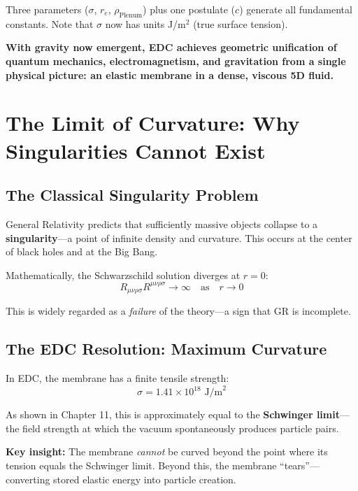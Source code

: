 Three parameters ($\sigma$, $r_e$, $\rho_{\text{Plenum}}$) plus one postulate ($c$) generate all fundamental constants. Note that $\sigma$ now has units J/m$^2$ (true surface tension).

\textbf{With gravity now emergent, EDC achieves geometric unification of quantum mechanics, electromagnetism, and gravitation from a single physical picture: an elastic membrane in a dense, viscous 5D fluid.}


\section{The Limit of Curvature: Why Singularities Cannot Exist}
\label{sec:singularities}

\subsection{The Classical Singularity Problem}

General Relativity predicts that sufficiently massive objects collapse to a \textbf{singularity}---a point of infinite density and curvature. This occurs at the center of black holes and at the Big Bang.

Mathematically, the Schwarzschild solution diverges at $r = 0$:
\begin{equation}
R_{\mu\nu\rho\sigma}R^{\mu\nu\rho\sigma} \to \infty \quad \text{as} \quad r \to 0
\end{equation}

This is widely regarded as a \textit{failure} of the theory---a sign that GR is incomplete.

\subsection{The EDC Resolution: Maximum Curvature}

In EDC, the membrane has a finite tensile strength:
\begin{equation}
\sigma = 1.41 \times 10^{18} \text{ J/m}^2
\end{equation}

As shown in Chapter 11, this is approximately equal to the \textbf{Schwinger limit}---the field strength at which the vacuum spontaneously produces particle pairs.

\textbf{Key insight:} The membrane \textit{cannot} be curved beyond the point where its tension equals the Schwinger limit. Beyond this, the membrane ``tears''---converting stored elastic energy into particle creation.

